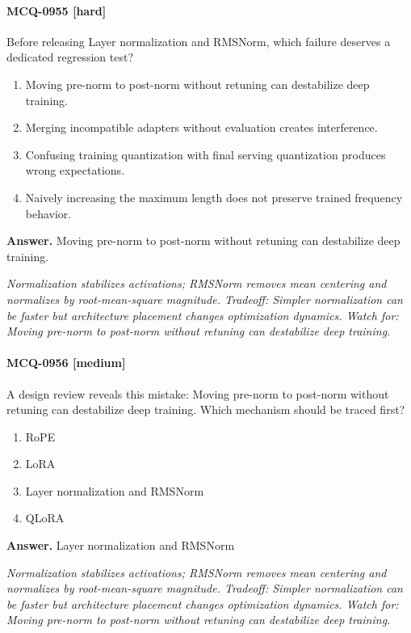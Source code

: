 \paragraph{MCQ-0955 [hard]} Before releasing Layer normalization and RMSNorm, which failure deserves a dedicated regression test?
\begin{enumerate}[label=\Alph*.]
\item Moving pre-norm to post-norm without retuning can destabilize deep training.
\item Merging incompatible adapters without evaluation creates interference.
\item Confusing training quantization with final serving quantization produces wrong expectations.
\item Naively increasing the maximum length does not preserve trained frequency behavior.
\end{enumerate}
\noindent\textbf{Answer.} Moving pre-norm to post-norm without retuning can destabilize deep training.
\par\textit{Normalization stabilizes activations; RMSNorm removes mean centering and normalizes by root-mean-square magnitude. Tradeoff: Simpler normalization can be faster but architecture placement changes optimization dynamics. Watch for: Moving pre-norm to post-norm without retuning can destabilize deep training.}
\paragraph{MCQ-0956 [medium]} A design review reveals this mistake: Moving pre-norm to post-norm without retuning can destabilize deep training. Which mechanism should be traced first?
\begin{enumerate}[label=\Alph*.]
\item RoPE
\item LoRA
\item Layer normalization and RMSNorm
\item QLoRA
\end{enumerate}
\noindent\textbf{Answer.} Layer normalization and RMSNorm
\par\textit{Normalization stabilizes activations; RMSNorm removes mean centering and normalizes by root-mean-square magnitude. Tradeoff: Simpler normalization can be faster but architecture placement changes optimization dynamics. Watch for: Moving pre-norm to post-norm without retuning can destabilize deep training.}
